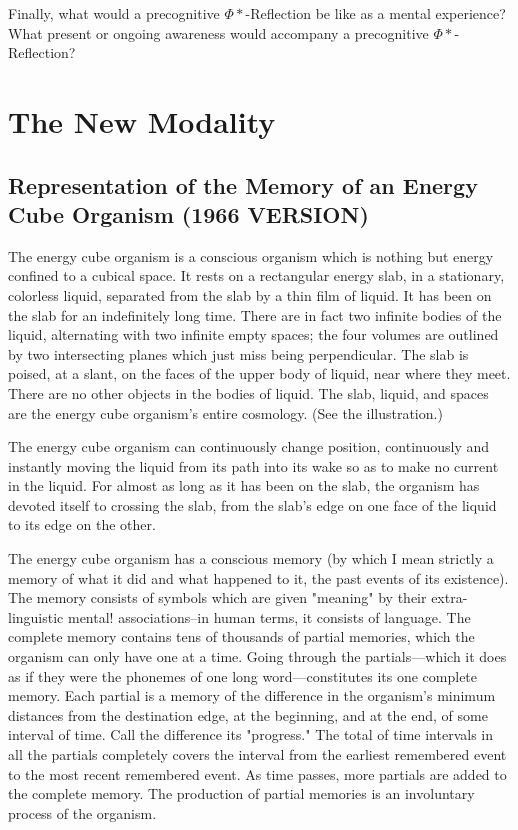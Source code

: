\documentclass[10pt,twoside]{memoir}
\begin{document}
\begin{enumerate}
{\begin{enumerate}
\begin{sysrules}
\begin{sysrules}
\begin{sysrules}
\begin{sysrules}
{\begin{enumerate}
Finally, what would a precognitive $\Phi*$-Reflection be like as a mental 
experience? What present or ongoing awareness would accompany a 
precognitive $\Phi*$-Reflection? 

\part{The New Modality}

\chapter{Representation of the Memory of an Energy Cube Organism (1966 VERSION)}


The energy cube organism is a conscious organism which is nothing but 
energy confined to a cubical space. It rests on a rectangular energy slab, in a 
stationary, colorless liquid, separated from the slab by a thin film of liquid. 
It has been on the slab for an indefinitely long time. There are in fact two 
infinite bodies of the liquid, alternating with two infinite empty spaces; the 
four volumes are outlined by two intersecting planes which just miss being 
perpendicular. The slab is poised, at a slant, on the faces of the upper body 
of liquid, near where they meet. There are no other objects in the bodies of 
liquid. The slab, liquid, and spaces are the energy cube organism's entire 
cosmology. (See the illustration.) 


The energy cube organism can continuously change position, 
continuously and instantly moving the liquid from its path into its wake so 
as to make no current in the liquid. For almost as long as it has been on the 
slab, the organism has devoted itself to crossing the slab, from the slab's edge 
on one face of the liquid to its edge on the other. 

The energy cube organism has a conscious memory (by which I mean 
strictly a memory of what it did and what happened to it, the past events of 
its existence). The memory consists of symbols which are given "meaning" 
by their extra-linguistic mental! associations--in human terms, it consists of 
language. The complete memory contains tens of thousands of partial 
memories, which the organism can only have one at a time. Going through 
the partials---which it does as if they were the phonemes of one long 
word---constitutes its one complete memory. Each partial is a memory of the 
difference in the organism's minimum distances from the destination edge, at 
the beginning, and at the end, of some interval of time. Call the difference its 
"progress." The total of time intervals in all the partials completely covers 
the interval from the earliest remembered event to the most recent 
remembered event. As time passes, more partials are added to the complete 
memory. The production of partial memories is an involuntary process of 
the organism. 


\end{enumerate}}
\end{sysrules}
\end{sysrules}
\end{sysrules}
\end{sysrules}
\end{enumerate}}
\end{enumerate}
\end{document}

